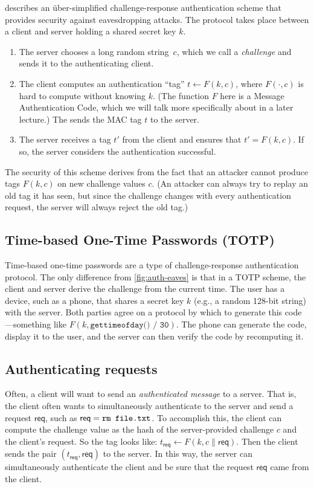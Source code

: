  describes an \"uber-simplified challenge-response
authentication scheme that provides security against eavesdropping attacks.
The protocol takes place between a client and server holding a shared secret key $k$.
\begin{enumerate}
	\item The server chooses a long random string~$c$, which we call a \textit{challenge} 
        and sends it to the authenticating client.
  \item The client computes an authentication ``tag'' $t \gets F(k, c)$, where $F(\cdot, c)$ is hard to compute without knowing $k$.
        (The function $F$ here is a Message Authentication Code, 
        which we will talk more specifically about in a later lecture.) %
        The sends the MAC tag $t$ to the server.
  \item The server receives a tag $t'$ from the client and ensures that $t' = F(k,c)$.
        If so, the server considers the authentication successful.
\end{enumerate}
The security of this scheme derives from the fact that an attacker cannot
produce tags $F(k,c)$ on new challenge values $c$. (An attacker can always
try to replay an old tag it has seen, but since the challenge changes with
every authentication request, the server will always reject the old tag.)

\subsection{Time-based One-Time Passwords (TOTP)}
Time-based one-time passwords are a type of challenge-response authentication
protocol. The only difference from \cref{fig:auth-eaves} is that in a TOTP
scheme, the client and server derive the challenge from the current time.
The user has a device, such as 
a phone, that shares a secret key $k$ (e.g., a random 128-bit string) 
with the server.
Both parties agree on a protocol by which to
generate this code---something like $F(k, \texttt{gettimeofday() / 30})$.
The phone can generate the code, display it to the user, and the server
can then verify the code by recomputing it.


\subsection{Authenticating requests}
Often, a client will want to send an \emph{authenticated message} to a server.
That is, the client often wants to simultaneously authenticate to the server
and send a request $\mathsf{req}$, such as $\mathsf{req} = \ttt{rm file.txt}$.
To accomplish this, the client can compute the challenge value as 
the hash of the server-provided challenge $c$ and the client's request.
So the tag looks like:
$t_{\mathsf{req}} \gets F(k, c \| \mathsf{req})$.
Then the client sends the pair $(t_{\mathsf{req}}, \mathsf{req})$ to the server.
In this way, the server can simultaneously authenticate the client
and be sure that the request $\mathsf{req}$ came from the client.

